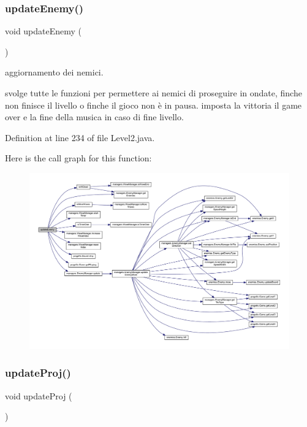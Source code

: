 \subsubsection{\texorpdfstring{update\+Enemy()}{updateEnemy()}}
{\footnotesize\ttfamily void update\+Enemy (\begin{DoxyParamCaption}{ }\end{DoxyParamCaption})}



aggiornamento dei nemici. 

svolge tutte le funzioni per permettere ai nemici di proseguire in ondate, finche non finisce il livello o finche il gioco non è in pausa. imposta la vittoria il game over e la fine della musica in caso di fine livello. 

Definition at line 234 of file Level2.\+java.

Here is the call graph for this function\+:
\nopagebreak
\begin{figure}[H]
\begin{center}
\leavevmode
\includegraphics[width=350pt]{classscenes_1_1_level2_af005ec68c869a6acd5e833cba9330a50_cgraph}
\end{center}
\end{figure}
\mbox{\label{classscenes_1_1_level2_ac83c203b559f6fd0bb225744d7ccf854}} 
\subsubsection{\texorpdfstring{update\+Proj()}{updateProj()}}
{\footnotesize\ttfamily void update\+Proj (\begin{DoxyParamCaption}{ }\end{DoxyParamCaption})}



